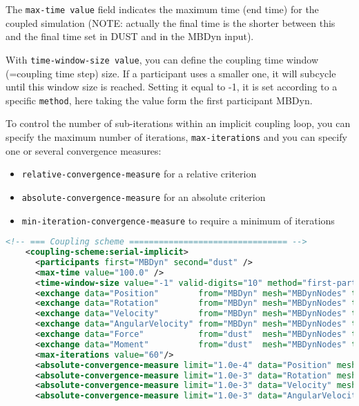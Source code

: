 The \texttt{max-time value} field indicates the maximum time (end time) for the coupled simulation  (NOTE: actually the final time is the shorter between this and the final time set in DUST and in the MBDyn input).

With \texttt{time-window-size value}, you can define the coupling time window (=coupling time step) size. If a participant uses a smaller one, it will subcycle until this window size is reached. 
Setting it equal to -1, it is set according to a specific \texttt{method}, here taking the value form the first participant MBDyn.

To control the number of sub-iterations within an implicit coupling loop, you can specify the maximum number of iterations, \texttt{max-iterations} and you can specify one or several convergence measures:
\begin{itemize}
    \item \texttt{relative-convergence-measure} for a relative criterion
    \item \texttt{absolute-convergence-measure} for an absolute criterion
    \item \texttt{min-iteration-convergence-measure} to require a minimum of iterations
\end{itemize}

\begin{lstlisting}[language=XML]
    <!-- === Coupling scheme ================================ -->
    <coupling-scheme:serial-implicit>
      <participants first="MBDyn" second="dust" />
      <max-time value="100.0" />
      <time-window-size value="-1" valid-digits="10" method="first-participant" />
      <exchange data="Position"        from="MBDyn" mesh="MBDynNodes" to="dust" />
      <exchange data="Rotation"        from="MBDyn" mesh="MBDynNodes" to="dust" />
      <exchange data="Velocity"        from="MBDyn" mesh="MBDynNodes" to="dust" />
      <exchange data="AngularVelocity" from="MBDyn" mesh="MBDynNodes" to="dust" />
      <exchange data="Force"           from="dust"  mesh="MBDynNodes" to="MBDyn" />
      <exchange data="Moment"          from="dust"  mesh="MBDynNodes" to="MBDyn" />
      <max-iterations value="60"/>
      <absolute-convergence-measure limit="1.0e-4" data="Position" mesh="MBDynNodes" />
      <absolute-convergence-measure limit="1.0e-3" data="Rotation" mesh="MBDynNodes" />
      <absolute-convergence-measure limit="1.0e-3" data="Velocity" mesh="MBDynNodes" />
      <absolute-convergence-measure limit="1.0e-3" data="AngularVelocity" mesh="MBDynNodes" /> 
\end{lstlisting}

